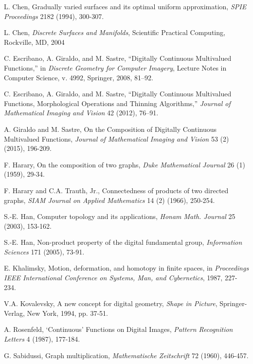 \documentclass{article}
\theoremstyle{plain}
\theoremstyle{definition}
\numberwithin{thm}{section}
\begin{document}
\begin{thebibliography}{11}
L. Chen, Gradually varied surfaces and its optimal uniform approximation, {\em SPIE Proceedings}
2182 (1994), 300-307.

L. Chen, {\em Discrete Surfaces and Manifolds}, Scientific Practical Computing, Rockville, MD, 2004

C. Escribano, A. Giraldo, and M. Sastre,
``Digitally Continuous Multivalued Functions,''
in \emph{Discrete Geometry for Computer Imagery}, Lecture Notes in Computer Science, v. 4992, Springer,
2008, 81--92.

C. Escribano, A. Giraldo, and M. Sastre,
``Digitally Continuous Multivalued Functions, Morphological Operations and Thinning Algorithms,''
\emph{Journal of Mathematical Imaging and Vision} 42 (2012), 76--91.

A. Giraldo and M. Sastre,
On the Composition of Digitally Continuous Multivalued Functions,
{\em Journal of Mathematical Imaging and Vision} 53 (2) (2015), 196-209.

F. Harary,
On the composition of two graphs,
{\em Duke Mathematical Journal} 26 (1) (1959), 29-34.

F. Harary and C.A. Trauth, Jr.,
Connectedness of products of two directed graphs,
{\em SIAM Journal on Applied Mathematics} 14 (2) (1966), 250-254.

S.-E. Han,
Computer topology and its applications,
{\em Honam Math. Journal} 25 (2003),
153-162.

S.-E. Han,
Non-product property of the digital fundamental group,
{\em Information Sciences} 171 (2005), 73-91.

E. Khalimsky,
Motion, deformation, and homotopy in finite spaces, in
{\em Proceedings IEEE International Conference on Systems, Man, and Cybernetics},
1987, 227-234.

V.A. Kovalevsky,
A new concept for digital geometry,
{\em Shape in Picture},
Springer-Verlag, New York, 1994, pp. 37-51.

A. Rosenfeld,
`Continuous' Functions on Digital Images,
{\em Pattern Recognition Letters} 4 (1987), 177-184.

G. Sabidussi,
Graph multiplication,
{\em Mathematische Zeitschrift} 72 (1960),
446-457.

\begin{comment}
\bibitem{Soille}
Soille, P.: Morphological operators. In: Jähne, B., et al. (eds.), Signal
Processing and Pattern Recognition. Handbook of Computer
Vision and Applications, vol. 2, pp. 627?682. Academic Press,
San Diego (1999).
\end{comment}


\end{thebibliography}
\end{document}
